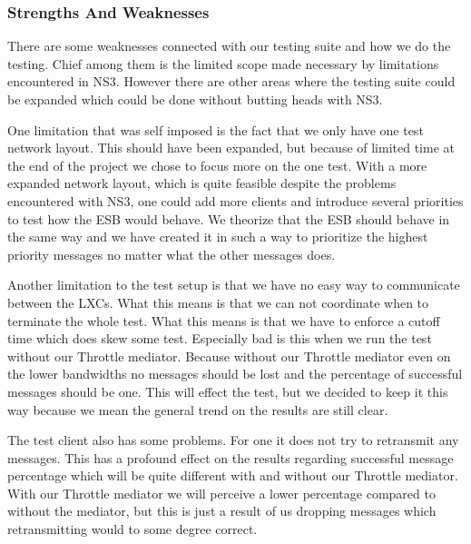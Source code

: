 \subsubsection{Strengths And Weaknesses}\label{Testing:About:Strengths}
	There are some weaknesses connected with our testing suite and how we do the testing. Chief among them is the limited scope made necessary by limitations encountered in NS3. However there are other areas where the testing suite could be expanded which could be done without butting heads with NS3.
	
	One limitation that was self imposed is the fact that we only have one test network layout. This should have been expanded, but because of limited time at the end of the project we chose to focus more on the one test. With a more expanded network layout, which is quite feasible despite the problems encountered with NS3, one could add more clients and introduce several priorities to test how the ESB would behave. We theorize that the ESB should behave in the same way and we have created it in such a way to prioritize the highest priority messages no matter what the other messages does.
	
	Another limitation to the test setup is that we have no easy way to communicate between the LXCs. What this means is that we can not coordinate when to terminate the whole test. What this means is that we have to enforce a cutoff time which does skew some test. Especially bad is this when we run the test without our Throttle mediator. Because without our Throttle mediator even on the lower bandwidths no messages should be lost and the percentage of successful messages should be one. This will effect the test, but we decided to keep it this way because we mean the general trend on the results are still clear.
	
	The test client also has some problems. For one it does not try to retransmit any messages. This has a profound effect on the results regarding successful message percentage which will be quite different with and without our Throttle mediator. With our Throttle mediator we will perceive a lower percentage compared to without the mediator, but this is just a result of us dropping messages which retransmitting would to some degree correct.
